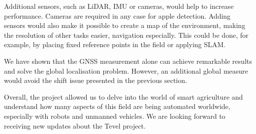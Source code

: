 \documentclass[letterpaper,twocolumn,10pt]{article}
\begin{document}
Additional sensors, such as LiDAR, IMU or cameras, would help to increase performance. Cameras are required in any case for apple detection. Adding sensors would also make it possible to create a map of the environment, making the resolution of other tasks easier, navigation especially. This could be done, for example, by placing fixed reference points in the field or applying SLAM.

We have shown that the GNSS measurement alone can achieve remarkable results and solve the global localisation problem. However, an additional global measure would avoid the shift issue presented in the previous section.

Overall, the project allowed us to delve into the world of smart agriculture and understand how many aspects of this field are being automated worldwide, especially with robots and unmanned vehicles. We are looking forward to receiving new updates about the Tevel project. 
\end{document}
